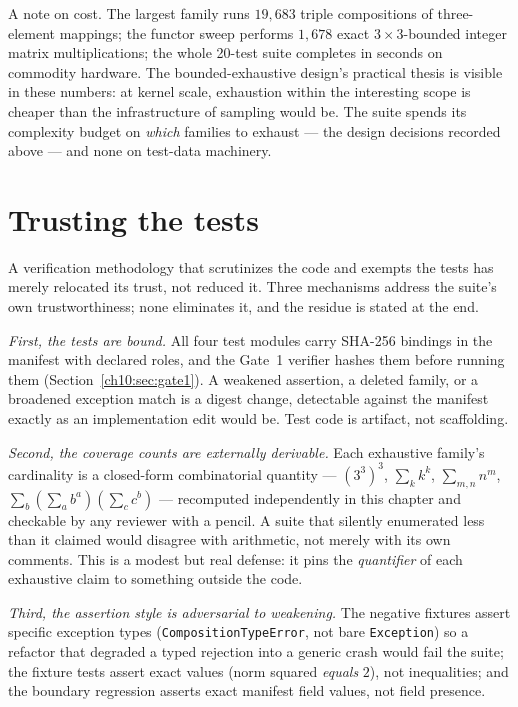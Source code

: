 A note on cost. The largest family runs $19{,}683$ triple compositions
of three-element mappings; the functor sweep performs $1{,}678$ exact
$3 \times 3$-bounded integer matrix multiplications; the whole
20-test suite completes in seconds on commodity hardware. The
bounded-exhaustive design's practical thesis is visible in these
numbers: at kernel scale, exhaustion within the interesting scope is
cheaper than the infrastructure of sampling would be. The suite spends
its complexity budget on \emph{which} families to exhaust --- the
design decisions recorded above --- and none on test-data machinery.

\section{Trusting the tests}\label{ch10:sec:trust}

A verification methodology that scrutinizes the code and exempts the
tests has merely relocated its trust, not reduced it. Three mechanisms
address the suite's own trustworthiness; none eliminates it, and the
residue is stated at the end.

\emph{First, the tests are bound.} All four test modules carry SHA-256
bindings in the manifest with declared roles, and the Gate~1 verifier
hashes them before running them (Section~\ref{ch10:sec:gate1}). A
weakened assertion, a deleted family, or a broadened exception match is a
digest change, detectable against the manifest exactly as an
implementation edit would be. Test code is artifact, not scaffolding.

\emph{Second, the coverage counts are externally derivable.} Each
exhaustive family's cardinality is a closed-form combinatorial quantity
--- $(3^3)^3$, $\sum_k k^k$, $\sum_{m,n} n^m$,
$\sum_b (\sum_a b^a)(\sum_c c^b)$ --- recomputed independently in this
chapter and checkable by any reviewer with a pencil. A suite that
silently enumerated less than it claimed would disagree with arithmetic,
not merely with its own comments. This is a modest but real defense: it
pins the \emph{quantifier} of each exhaustive claim to something outside
the code.

\emph{Third, the assertion style is adversarial to weakening.} The
negative fixtures assert specific exception types
(\texttt{CompositionTypeError}, not bare \texttt{Exception}) so a
refactor that degraded a typed rejection into a generic crash would
fail the suite; the fixture tests assert exact values (norm squared
\emph{equals} $2$), not inequalities; and the boundary regression
asserts exact manifest field values, not field presence.

